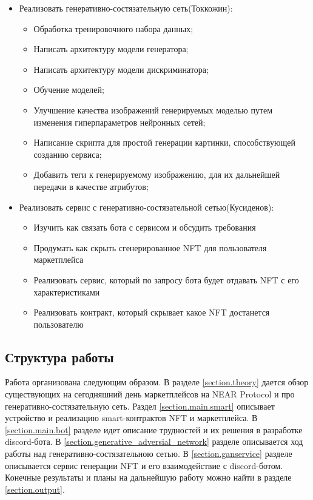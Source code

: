 \begin{itemize}
\begin{itemize}
    \end{itemize}
    \item Реализовать генеративно-состязательную сеть(Токкожин):
    \begin{itemize}
        \item Обработка тренировочного набора данных;
        \item Написать архитектуру модели генератора;
        \item Написать архитектуру модели дискриминатора;
        \item Обучение моделей;
        \item Улучшение качества изображений генерируемых моделью путем изменения гиперпараметров нейронных сетей;
        \item Написание скрипта для простой генерации картинки, способствующей созданию сервиса;
        \item Добавить теги к генерируемому изображению, для их дальнейшей передачи в качестве атрибутов;
    \end{itemize}
        \item Реализовать сервис с генеративно-состязательной сетью(Кусиденов):
    \begin{itemize}
    	\item Изучить как связать бота с сервисом и обсудить требования
    	\item Продумать как скрыть сгенерированное NFT для пользователя маркетплейса
    	\item Реализовать сервис, который по запросу бота будет отдавать NFT с его характеристиками
    	\item Реализовать контракт, который скрывает какое NFT достанется пользователю
    \end{itemize}
\end{itemize}

\subsection{Структура работы}

Работа организована следующим образом. В разделе {\color{blue} \ref{section.theory}} дается обзор существующих на сегодняшний день маркетплейсов на NEAR Protocol и про генеративно-состязательную сеть. Раздел {\color{blue} \ref{section.main.smart}} описывает устройство и реализацию smart-контрактов NFT и маркетплейса. В {\color{blue} \ref{section.main.bot}} разделе идет описание трудностей и их решения в разработке discord-бота. В {\color{blue} \ref{section.generative_adversial_network}} разделе описывается ход работы над генеративно-состязательною сетью. В {\color{blue} \ref{section.ganservice}} разделе описывается сервис генерации NFT и его взаимодействие с discord-ботом.
Конечные результаты и планы на дальнейшую работу можно найти в разделе {\color{blue} \ref{section.output}}.
